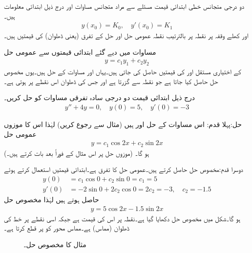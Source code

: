 دو درجی متجانس خطی ابتدائی قیمت مسئلے سے مراد متجانس مساوات  اور درج ذیل ابتدائی معلومات ہیں۔
\begin{align}\label{مساوات_سادہ_دو_درجی_ابتدائی_قیمتیں}
y(x_0)=K_0,\quad y'(x_0)=K_1
\end{align}
 اور   کھلے وقفہ پر نقطہ  پر بالترتیب نقطہ عمومی حل اور حل کے تفرق (یعنی ڈھلوان) کی قیمتیں ہیں۔ 

مساوات  میں دیے گئے ابتدائی قیمتوں سے عمومی حل
\begin{align}
y=c_1y_1+c_2y_2
\end{align}
کے اختیاری مستقل  اور  کی قیمتیں حاصل کی جاتی ہیں۔یہاں  اور  مساوات  کے حل ہیں۔یوں مخصوص حل حاصل کیا جاتا ہے جو نقطہ  سے گزرتا ہے اور جس کی ڈھلوان اس نقطے پر  ہوتی ہے۔

درج ذیل ابتدائی قیمت دو درجی سادہ تفرقی مساوات کو حل کریں۔
\begin{align*}
y''+4y=0,\quad y(0)=5,\quad y'(0)=-3
\end{align*}

حل:پہلا قدم: \quad اس مساوات کے حل   اور  ہیں (مثال  سے رجوع کریں) لہٰذا اس کا موزوں عمومی حل
\begin{align}\label{مساوات_سادہ_دو_درجی_عمومی_حل_الف}
y=c_1\cos 2x+c_2\sin 2x
\end{align}
ہو گا۔ (موزوں حل پر اس مثال کے فوراً بعد بات کرتے ہیں۔)

دوسرا قدم:مخصوص حل حاصل کرتے ہیں۔عمومی حل کا تفرق  ہے۔ابتدائی قیمتیں استعمال کرتے ہوئے
\begin{align*}
y(0)&=c_1 \cos 0+c_2\sin 0=c_1=5\\
y'(0)&=-2\sin 0+2c_2\cos 0=2c_2=-3, \quad c_2=-1.5
\end{align*}
حاصل ہوتے ہیں لہٰذا مخصوص حل
\begin{align*}
y=5\cos 2x-1.5\sin 2x
\end{align*}
ہو گا۔شکل  میں مخصوص حل دکھایا گیا ہے۔نقطہ  پر اس کی قیمت  ہے جبکہ اسی نقطے پر خط کی ڈھلوان (مماس)  ہے۔مماس  محور کو  پر قطع کرتا ہے۔
\begin{figure}
\centering
{}
\caption{مثال  کا مخصوص حل۔}
\label{شکل_مثال_سادہ_دو_درجی_ابتدائی_قیمت_الف}
\end{figure}

